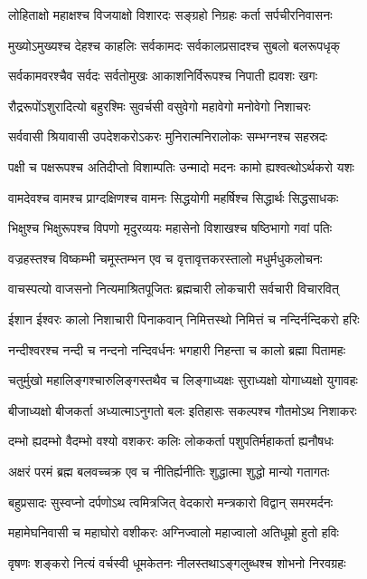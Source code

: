 \twolineshloka
{लोहिताक्षो महाक्षश्च विजयाक्षो विशारदः}%
{सङ्ग्रहो निग्रहः कर्ता सर्पचीरनिवासनः}%

\twolineshloka
{मुख्योऽमुख्यश्च देहश्च काहलिः सर्वकामदः}%
{सर्वकालप्रसादश्च सुबलो बलरूपधृक्}%

\twolineshloka
{सर्वकामवरश्चैव सर्वदः सर्वतोमुखः}%
{आकाशनिर्विरूपश्च निपाती ह्यवशः खगः}%

\twolineshloka
{रौद्ररूपोंऽशुरादित्यो बहुरश्मिः सुवर्चसी}%
{वसुवेगो महावेगो मनोवेगो निशाचरः}%

\twolineshloka
{सर्ववासी श्रियावासी उपदेशकरोऽकरः}%
{मुनिरात्मनिरालोकः सम्भग्नश्च सहस्रदः}%

\twolineshloka
{पक्षी च पक्षरूपश्च अतिदीप्तो विशाम्पतिः}%
{उन्मादो मदनः कामो ह्यश्वत्थोऽर्थकरो यशः}%

\twolineshloka
{वामदेवश्च वामश्च प्राग्दक्षिणश्च वामनः}%
{सिद्धयोगी महर्षिश्च सिद्धार्थः सिद्धसाधकः}%

\twolineshloka
{भिक्षुश्च भिक्षुरूपश्च विपणो मृदुरव्ययः}%
{महासेनो विशाखश्च षष्ठिभागो गवां पतिः}%

\twolineshloka
{वज्रहस्तश्च विष्कम्भी चमूस्तम्भन एव च}%
{वृत्तावृत्तकरस्तालो मधुर्मधुकलोचनः}%

\twolineshloka
{वाचस्पत्यो वाजसनो नित्यमाश्रितपूजितः}%
{ब्रह्मचारी लोकचारी सर्वचारी विचारवित्}%

\twolineshloka
{ईशान ईश्वरः कालो निशाचारी पिनाकवान्}%
{निमित्तस्थो निमित्तं च नन्दिर्नन्दिकरो हरिः}%

\twolineshloka
{नन्दीश्वरश्च नन्दी च नन्दनो नन्दिवर्धनः}%
{भगहारी निहन्ता च कालो ब्रह्मा पितामहः}%

\twolineshloka
{चतुर्मुखो महालिङ्गश्चारुलिङ्गस्तथैव च}%
{लिङ्गाध्यक्षः सुराध्यक्षो योगाध्यक्षो युगावहः}%

\twolineshloka
{बीजाध्यक्षो बीजकर्ता अध्यात्माऽनुगतो बलः}%
{इतिहासः सकल्पश्च गौतमोऽथ निशाकरः}%

\twolineshloka
{दम्भो ह्यदम्भो वैदम्भो वश्यो वशकरः कलिः}%
{लोककर्ता पशुपतिर्महाकर्ता ह्यनौषधः}%

\twolineshloka
{अक्षरं परमं ब्रह्म बलवच्चक्र एव च}%
{नीतिर्ह्यनीतिः शुद्धात्मा शुद्धो मान्यो गतागतः}%

\twolineshloka
{बहुप्रसादः सुस्वप्नो दर्पणोऽथ त्वमित्रजित्}%
{वेदकारो मन्त्रकारो विद्वान् समरमर्दनः}%

\twolineshloka
{महामेघनिवासी च महाघोरो वशीकरः}%
{अग्निज्वालो महाज्वालो अतिधूम्रो हुतो हविः}%

\twolineshloka
{वृषणः शङ्करो नित्यं वर्चस्वी धूमकेतनः}%
{नीलस्तथाऽङ्गलुब्धश्च शोभनो निरवग्रहः}%

